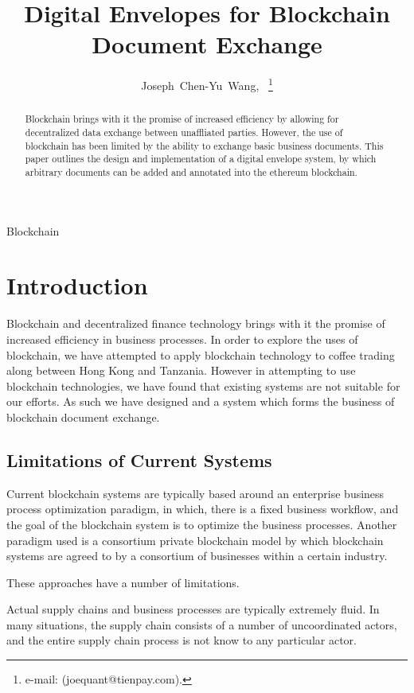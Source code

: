 \documentclass[journal]{IEEEtran}
\begin{document}
\title{Digital Envelopes for Blockchain Document Exchange}
\author{Joseph~Chen-Yu~Wang,~
\thanks{e-mail: (joequant@tienpay.com).}}
\maketitle

\begin{abstract}
Blockchain brings with it the promise of increased efficiency by
allowing for decentralized data exchange between unaffliated parties.
However, the use of blockchain has been limited by the ability to
exchange basic business documents.  This paper outlines the design and
implementation of a digital envelope system, by which arbitrary
documents can be added and annotated into the ethereum blockchain.
\end{abstract}


\begin{IEEEkeywords}
Blockchain
\end{IEEEkeywords}

\section{Introduction}
Blockchain and decentralized finance technology brings with it the
promise of increased efficiency in business processes.  In order to
explore the uses of blockchain, we have attempted to apply blockchain
technology to coffee trading along between Hong Kong and Tanzania.
However in attempting to use blockchain technologies, we have found
that existing systems are not suitable for our efforts.  As such we
have designed and a system which forms the business of blockchain
document exchange.

\subsection{Limitations of Current Systems}

Current blockchain systems are typically based around an enterprise
business process optimization paradigm, in which, there is a fixed
business workflow, and the goal of the blockchain system is to
optimize the business processes.  Another paradigm used is a
consortium private blockchain model by which blockchain systems are
agreed to by a consortium of businesses within a certain industry.

These approaches have a number of limitations.

Actual supply chains and business processes are typically extremely
fluid.  In many situations, the supply chain consists of a number of
uncoordinated actors, and the entire supply chain process is not know
to any particular actor.  
\end{document}
